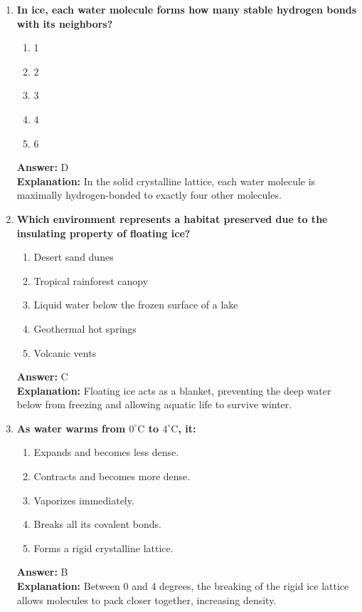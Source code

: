 \documentclass[11pt, a4paper]{article}
\begin{document}
\begin{enumerate}
\item \textbf{In ice, each water molecule forms how many stable hydrogen bonds with its neighbors?}
\begin{enumerate}[label=\Alph*.]
    \item 1
    \item 2
    \item 3
    \item 4
    \item 6
\end{enumerate}
\textbf{Answer:} D \\
\textbf{Explanation:} In the solid crystalline lattice, each water molecule is maximally hydrogen-bonded to exactly four other molecules.

\item \textbf{Which environment represents a habitat preserved due to the insulating property of floating ice?}
\begin{enumerate}[label=\Alph*.]
    \item Desert sand dunes
    \item Tropical rainforest canopy
    \item Liquid water below the frozen surface of a lake
    \item Geothermal hot springs
    \item Volcanic vents
\end{enumerate}
\textbf{Answer:} C \\
\textbf{Explanation:} Floating ice acts as a blanket, preventing the deep water below from freezing and allowing aquatic life to survive winter.

\item \textbf{As water warms from $0^\circ\text{C}$ to $4^\circ\text{C}$, it:}
\begin{enumerate}[label=\Alph*.]
    \item Expands and becomes less dense.
    \item Contracts and becomes more dense.
    \item Vaporizes immediately.
    \item Breaks all its covalent bonds.
    \item Forms a rigid crystalline lattice.
\end{enumerate}
\textbf{Answer:} B \\
\textbf{Explanation:} Between 0 and 4 degrees, the breaking of the rigid ice lattice allows molecules to pack closer together, increasing density.


\end{enumerate}
\end{document}
